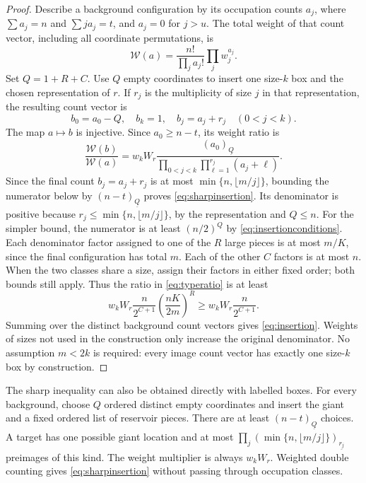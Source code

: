 \documentclass[11pt]{amsart}
\theoremstyle{remark}\newtheorem{remark}[theorem]{Remark}
\newcommand{\fall}[2]{(#1)_{\underline{#2}}}
\begin{document}
\begin{proof}
Describe a background configuration by its occupation counts $a_j$, where
$\sum a_j=n$ and $\sum j a_j=t$, and $a_j=0$ for $j>u$. The total weight of
that count vector, including all coordinate permutations, is
\[
 \mathcal W(a)=\frac{n!}{\prod_j a_j!}\prod_j w_j^{a_j}.
\]
Set $Q=1+R+C$. Use $Q$ empty coordinates to insert one size-$k$ box and the
chosen representation of $r$. If $r_j$ is the multiplicity of size $j$ in
that representation, the resulting count vector is
\[
 b_0=a_0-Q,\quad b_k=1,\quad b_j=a_j+r_j\quad(0<j<k).
\]
The map $a\mapsto b$ is injective. Since $a_0\ge n-t$, its weight ratio is
\begin{equation}\label{eq:typeratio}
 \frac{\mathcal W(b)}{\mathcal W(a)}
 =w_kW_r\frac{\fall{a_0}{Q}}
 {\displaystyle\prod_{0<j<k}\prod_{\ell=1}^{r_j}(a_j+\ell)}.
\end{equation}
Since the final count $b_j=a_j+r_j$ is at most
$\min\{n,\lfloor m/j\rfloor\}$, bounding the numerator below by
$\fall{n-t}{Q}$ proves \eqref{eq:sharpinsertion}. Its denominator is
positive because $r_j\le\min\{n,\lfloor m/j\rfloor\}$, by the representation
and $Q\le n$. For the simpler bound, the numerator is at
least $(n/2)^Q$ by \eqref{eq:insertionconditions}.
Each denominator factor assigned to one of the $R$ large pieces is at most
$m/K$, since the final configuration has total $m$. Each of the other $C$
factors is at most $n$. When the two classes share a size, assign their
factors in either fixed order; both bounds still apply. Thus the ratio in
\eqref{eq:typeratio} is at least
\[
 w_kW_r\frac{n}{2^{C+1}}
       \left(\frac{nK}{2m}\right)^R
 \ge w_kW_r\frac{n}{2^{C+1}}.
\]
Summing over the distinct background count vectors gives
\eqref{eq:insertion}. Weights of sizes not used in the construction only
increase the original denominator. No assumption $m<2k$ is required:
every image count vector has exactly one size-$k$ box by construction.
\end{proof}

The sharp inequality can also be obtained directly with labelled boxes.
For every background, choose $Q$ ordered distinct empty coordinates and
insert the giant and a fixed ordered list of reservoir pieces. There are
at least $\fall{n-t}{Q}$ choices. A target has one possible giant location
and at most
$\prod_j\fall{\min\{n,\lfloor m/j\rfloor\}}{r_j}$ preimages of this kind.
The weight multiplier is always $w_kW_r$. Weighted double counting gives
\eqref{eq:sharpinsertion} without passing through occupation classes.
\end{document}
